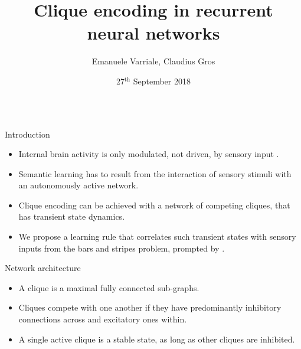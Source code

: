 \documentclass[final,hyperref={pdfpagelabels=false}]{beamer}
\title{Clique encoding in recurrent neural networks} %
\author[varriale@itp.uni-frankfurt.de]{Emanuele Varriale, Claudius Gros}
\institute{Institute for Theoretical Physics, Goethe University, Frankfurt am Main, Germany}
\date{27$^\text{th}$ September 2018}
\begin{document}
\begin{frame}
\hfill
\begin{columns}
	
	\hfill
	\begin{column}{.30\textwidth}
		\begin{minipage}[T]{.95\textwidth}	%
		\parbox[t][\columnheight]{\textwidth}{

			\begin{block}{Introduction}
			\begin{itemize}
					\item Internal brain activity is only modulated, not driven, by sensory input \cite{fiser2004modulation}. 
					
					\item Semantic learning has to result from the interaction of sensory stimuli with an autonomously active network.
					
					\item Clique encoding \cite{lin2006clique} can be achieved with a network of competing cliques, that has transient state dynamics.
										
					\item We propose a learning rule that correlates such transient states with sensory inputs from the bars and stripes problem, prompted by \cite{gros2010semantic}.
			\end{itemize}

			\end{block}
			
			\vfil
			\begin{block}{Network architecture}
				\begin{itemize}
					\item A clique is a maximal fully connected sub-graphs. 
					
					\item Cliques compete with one another if they have predominantly inhibitory connections across and excitatory ones within.
					
					\item A single active clique is a stable state, as long as other cliques are inhibited.
				\end{itemize}
			

\end{block}}
\end{minipage}
\end{column}
\end{columns}
\end{frame}
\end{document}
